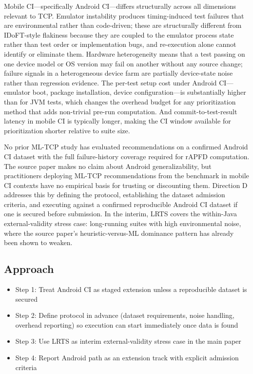\documentclass[10pt,conference]{IEEEtran}
\begin{document}
Mobile CI---specifically Android CI---differs structurally across all dimensions relevant to TCP. Emulator instability produces timing-induced test failures that are environmental rather than code-driven; these are structurally different from IDoFT-style flakiness because they are coupled to the emulator process state rather than test order or implementation bugs, and re-execution alone cannot identify or eliminate them. Hardware heterogeneity means that a test passing on one device model or OS version may fail on another without any source change; failure signals in a heterogeneous device farm are partially device-state noise rather than regression evidence. The per-test setup cost under Android CI---emulator boot, package installation, device configuration---is substantially higher than for JVM tests, which changes the overhead budget for any prioritization method that adds non-trivial pre-run computation. And commit-to-test-result latency in mobile CI is typically longer, making the CI window available for prioritization shorter relative to suite size.

No prior ML-TCP study has evaluated recommendations on a confirmed Android CI dataset with the full failure-history coverage required for rAPFD computation. The source paper makes no claim about Android generalizability, but practitioners deploying ML-TCP recommendations from the benchmark in mobile CI contexts have no empirical basis for trusting or discounting them. Direction D addresses this by defining the protocol, establishing the dataset admission criteria, and executing against a confirmed reproducible Android CI dataset if one is secured before submission. In the interim, LRTS covers the within-Java external-validity stress case: long-running suites with high environmental noise, where the source paper's heuristic-versus-ML dominance pattern has already been shown to weaken.

\subsection{Approach}

\begin{itemize}[leftmargin=*]
\item Step 1: Treat Android CI as staged extension unless a reproducible dataset is secured
\item Step 2: Define protocol in advance (dataset requirements, noise handling, overhead reporting) so execution can start immediately once data is found
\item Step 3: Use LRTS as interim external-validity stress case in the main paper
\item Step 4: Report Android path as an extension track with explicit admission criteria
\end{itemize}
\end{document}
